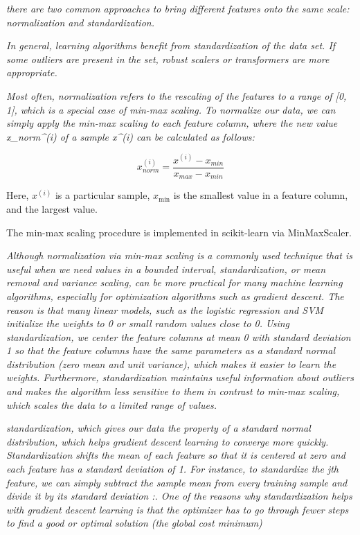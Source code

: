 \textit{there are two common approaches to bring different features onto the same scale: normalization and standardization.}

\textit{In general, learning algorithms benefit from standardization of the data set. If some outliers are present in the set, robust scalers or transformers are more appropriate.}

\textit{Most often, normalization refers to the rescaling of the features to a range of [0, 1], which is a special case of min-max scaling. To normalize our data, we can simply apply the min-max scaling to each feature column, where the new value x_{norm}^{(i)} of a sample x^{(i)} can be calculated as follows:}

\begin{equation} \label{eq:normalization}
    x_{norm}^{(i)} = \frac{x^{(i)} - x_{min}} {x_{max} - x_{min}}
\end{equation}

Here, $x^{(i)}$ is a particular sample, $x_{\min}$ is the smallest value in a feature column, and  the largest value.

The min-max scaling procedure is implemented in scikit-learn via MinMaxScaler.

\textit{Although normalization via min-max scaling is a commonly used technique that is useful when we need values in a bounded interval, standardization, or mean removal and variance scaling, can be more practical for many machine learning algorithms, especially for optimization algorithms such as gradient descent. The reason is that many linear models, such as the logistic regression and SVM initialize the weights to 0 or small random values close to 0. Using standardization, we center the feature columns at mean 0 with standard deviation 1 so that the feature columns have the same parameters as a standard normal distribution (zero mean and unit variance), which makes it easier to learn the weights. Furthermore, standardization maintains useful information about outliers and makes the algorithm less sensitive to them in contrast to min-max scaling, which scales the data to a limited range of values.}

\textit{standardization, which gives our data the property of a standard normal distribution, which helps gradient descent learning to converge more quickly. Standardization shifts the mean of each feature so that it is centered at zero and each feature has a standard deviation of 1. For instance, to standardize the jth feature, we can simply subtract the sample mean  from every training sample and divide it by its standard deviation :. One of the reasons why standardization helps with gradient descent learning is that the optimizer has to go through fewer steps to find a good or optimal solution (the global cost minimum)}


